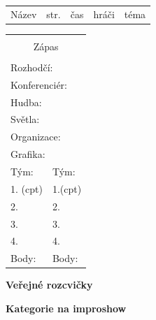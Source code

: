 \documentclass[a4paper,10pt,openany]{book}
\newcommand{\btbinfo}[6]{

\ifx Z#6 \textbf{#1} \else #1 \small{  (i)} \fi   & \pageref{#2} &  \small{#3} & \small{#4} & \small{#5}\hline
}
\begin{document}
\begin{longtable}{|p{4cm}|p{.4cm}|p{3.2cm}|p{3cm}|p{4.2cm}|}
\hline 
Název&str.&čas&hráči&téma \hline 


\end{longtable}
\pagebreak
\renewcommand{\btbinfo}[6]{
\ifx Z#6 #1   \fi

} 
\begin{multicols}{3}
 \begin{tabular}[t]{|p{25mm}|p{25mm}    |}
 \hline
 \multicolumn{2}{|c|}{ } \\
 \multicolumn{2}{|c|}{\large{Zápas}} \\
 \multicolumn{2}{|c|}{ } \\
\hline
\multicolumn{2}{|l|}{ Rozhodčí: }   \\ \hline
\multicolumn{2}{|l|}{ Konferenciér: }   \\ \hline
\multicolumn{2}{|l|}{ Hudba: }   \\ \hline
\multicolumn{2}{|l|}{ Světla: }   \\ \hline
\multicolumn{2}{|l|}{ Organizace: }   \\ \hline
\multicolumn{2}{|l|}{ Grafika: }   \\ \hline
Tým: &  Tým:\\ \hline
1. \small{(cpt)}  & 1.\small{(cpt)} \\ \hline
2.  & 2. \\ \hline
3. & 3. \\ \hline
4.  & 4. \\ \hline
Body:  & Body: \\ \hline

\end{tabular}
\vspace{3mm}

\end {multicols}
\renewcommand{\btbinfo}[6]{
\ifx Z#6  \else 
\large{#1 }

  \fi
}
\hline

\begin{multicols}{3}
\large{\textbf{Veřejné rozcvičky}}


\end {multicols}
\hline

\begin{multicols}{3}
\large{\textbf{Kategorie na improshow}}


\end {multicols}


\pagebreak

\begin{tabular}[t]{|p{3cm}|p{4cm}|p{1cm}|p{6cm}    |}

\end{tabular}
\pagebreak
\setcounter{tocdepth}{1}
\tableofcontents
\end{document}
